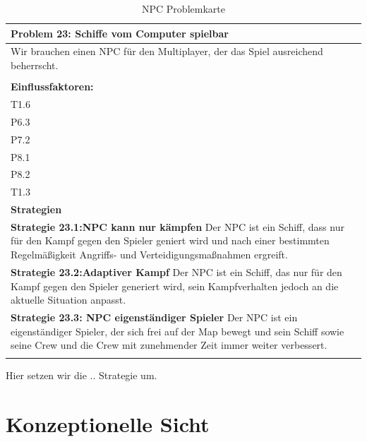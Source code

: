 \documentclass[fontsize=12pt,paper=a4,twoside]{scrartcl}
\begin{document}
\begin{table}[H]
    \centering
    \begin{tabular}{|p{15cm}|}
    \hline
          \textbf{Problem 23: Schiffe vom Computer spielbar}  \\ \hline
	Wir brauchen einen NPC für den Multiplayer, der das Spiel ausreichend beherrscht. \\
         \\ \hline
          \textbf{Einflussfaktoren: } \\
	T1.6 \\
	P6.3 \\
	P7.2 \\
	P8.1 \\
	P8.2 \\
	T1.3 \\
          \hline
          \textbf{Strategien} \\ \hline
            {}          
           \label{strategie:23.1}     
          \textbf{Strategie 23.1:NPC kann nur kämpfen} Der NPC ist ein Schiff, dass nur für den Kampf gegen den Spieler geniert wird und nach einer bestimmten Regelmäßigkeit Angriffs- und Verteidigungsmaßnahmen ergreift.  \\        
  {}          
           \label{strategie:23.2}              
          \textbf{Strategie 23.2:Adaptiver Kampf} Der NPC ist ein Schiff, das nur für den Kampf gegen den Spieler generiert wird, sein Kampfverhalten jedoch an die aktuelle Situation anpasst.   \\
	 {}          
           \label{strategie:23.3}     
          \textbf{Strategie 23.3: NPC eigenständiger Spieler} Der NPC ist ein eigenständiger Spieler, der sich frei auf der Map bewegt und sein Schiff sowie seine Crew und die Crew mit zunehmender Zeit immer weiter verbessert. \\ 
	 \\ \hline
    \end{tabular}

    \caption{NPC Problemkarte}
    \label{tab:ProblemKarte23}
\end{table}
Hier setzen wir die .. Strategie um. \\





\section{Konzeptionelle Sicht} \label{sec:konzeptionell}
\end{document}
